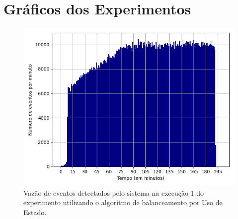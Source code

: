 \chapter{Gráficos dos Experimentos}
\label{ape:graphics}





\begin{figure}[h]
\centering
\includegraphics[width=\textwidth]{figuras/graphics/histogram_vazao_5-dez-su.png}
\caption{Vazão de eventos detectados pelo sistema na execução 1 do experimento utilizando o algoritmo de balanceamento por Uso de Estado.}
\label{fig:vazao_5-dez-su}
\end{figure}



